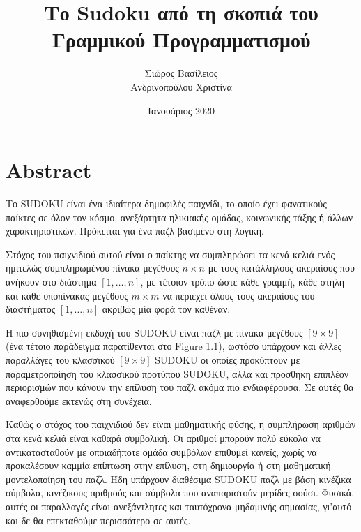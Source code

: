 \documentclass[12pt]{book}
\title{\huge Το Sudoku από τη σκοπιά του\\Γραμμικού Προγραμματισμού}
\author{Σιώρος Βασίλειος\\Ανδρινοπούλου Χριστίνα}
\date{Ιανουάριος 2020}
\theoremstyle{definition}
\begin{document}
\maketitle

\pagebreak

\tableofcontents

\chapter{Abstract}

Το SUDOKU είναι ένα ιδιαίτερα δημοφιλές παιχνίδι, το οποίο έχει φανατικούς παίκτες σε όλον τον κόσμο, ανεξάρτητα ηλικιακής ομάδας, κοινωνικής τάξης ή άλλων χαρακτηριστικών. Πρόκειται για ένα παζλ βασιμένο στη λογική. \par

Στόχος του παιχνιδιού αυτού είναι ο παίκτης να συμπληρώσει τα
κενά κελιά ενός ημιτελώς συμπληρωμένου πίνακα μεγέθους
\(n \times n\) με τους κατάλληλους ακεραίους που ανήκουν στο διάστημα \(\left[1,\dots,n \right]\), με τέτοιον τρόπο ώστε κάθε γραμμή, κάθε στήλη και κάθε υποπίνακας μεγέθους \(m \times m\) να περιέχει όλους τους ακεραίους του διαστήματος  \(\left[1,\dots,n \right]\) ακριβώς μία φορά τον καθέναν. \par

Η πιο συνηθισμένη εκδοχή του SUDOKU είναι παζλ με πίνακα μεγέθους \(\left[9 \times 9\right]\) (ένα τέτοιο παράδειγμα παρατίθενται στο Figure 1.1), ωστόσο υπάρχουν και άλλες παραλλάγες του κλασσικού \(\left[9 \times 9\right] \) SUDOKU οι οποίες προκύπτουν με παραμετροποίηση του κλασσικού προτύπου SUDOKU, αλλά και προσθήκη επιπλέον περιορισμών που κάνουν την επίλυση του παζλ ακόμα πιο ενδιαφέρουσα. Σε αυτές θα αναφερθούμε εκτενώς στη συνέχεια. \par

Καθώς ο στόχος του παιχνιδιού δεν είναι μαθηματικής φύσης, η συμπλήρωση αριθμών στα κενά κελιά είναι καθαρά συμβολική. Οι αριθμοί μπορούν πολύ εύκολα να αντικατασταθούν με οποιαδήποτε ομάδα συμβόλων επιθυμεί κανείς, χωρίς να προκαλέσουν καμμία επίπτωση στην επίλυση, στη δημιουργία ή στη μαθηματική μοντελοποίηση του παζλ. Ήδη υπάρχουν διαθέσιμα SUDOKU παζλ με βάση κινέζικα σύμβολα, κινέζικους αριθμούς και σύμβολα που αναπαριστούν μερίδες σούσι. Φυσικά, αυτές οι παραλλαγές είναι ανεξάντλητες και ταυτόχρονα μηδαμινής σημασίας, γι'αυτό και δε θα επεκταθούμε περισσότερο σε αυτές.
\end{document}

